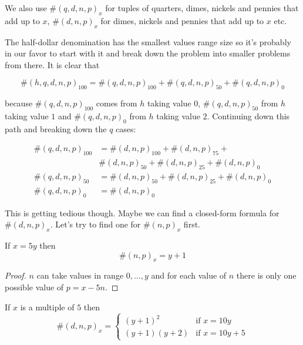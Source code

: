 We also use $\#(q, d, n, p)_x$ for tuples of quarters, dimes, nickels and pennies that add up to $x$, $\#(d, n, p)_x$ for dimes, nickels and pennies that add up to $x$ etc.

The half-dollar denomination has the smallest values range size so it's probably in our favor to start with it and break down the problem into smaller problems from there. It is clear that

\begin{equation*}
\#(h, q, d, n, p)_{100} = \#(q, d, n, p)_{100} + \#(q, d, n, p)_{50} + \#(q, d, n, p)_0
\end{equation*} 

because $\#(q, d, n, p)_{100}$ comes from $h$ taking value $0$, $\#(q, d, n, p)_{50}$ from $h$ taking value $1$ and $ \#(q, d, n, p)_0$ from $h$ taking value $2$. Continuing down this path and breaking down the $q$ cases:

\begin{equation*}
    \begin{split}
      \#(q, d, n, p)_{100} & = \#(d, n, p)_{100} + \#(d, n, p)_{75} +\\
      &  \#(d, n, p)_{50} + \#(d, n, p)_{25} + \#(d, n, p)_0\\
      \#(q, d, n, p)_{50} & = \#(d, n, p)_{50} + \#(d, n, p)_{25} + \#(d, n, p)_0\\
      \#(q, d, n, p)_{0} & = \#(d, n, p)_0
    \end{split}
\end{equation*} 

This is getting tedious though. Maybe we can find a closed-form formula for $\#(d, n, p)_{x}$. Let's try to find one for $\#(n, p)_{x}$ first.

\begin{lem}\label{np}
If $x = 5y$ then
\begin{equation*}
\#(n, p)_{x} = y + 1
\end{equation*}  
\end{lem}

\begin{proof}
 $n$ can take values in range $0, \ldots, y$ and for each value of $n$ there is only one possible value of $p = x - 5n$.
\end{proof}

\begin{lem}\label{dnp}
If $x$ is a multiple of $5$ then
\begin{equation*}
\#(d, n, p)_{x} = 
   \begin{cases}
       (y + 1)^2 & \text{if $x = 10 y$}\\
       (y + 1)(y + 2) & \text{if $x = 10y + 5$}
    \end{cases}   
\end{equation*}  
\end{lem}

